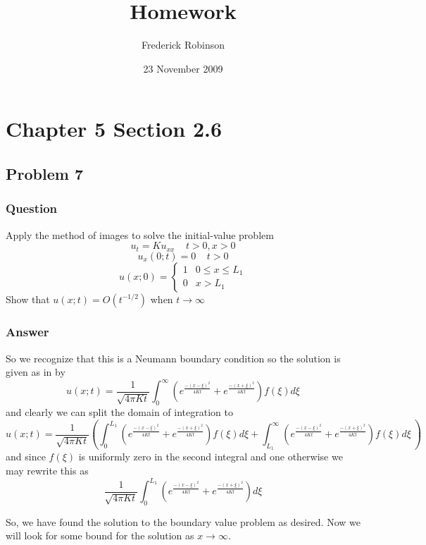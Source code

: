 \documentclass[12pt]{article}
\title{Homework}
\author{Frederick Robinson}
\date{23 November 2009}
\begin{document}

   \maketitle

\setcounter{tocdepth}{2} 

\tableofcontents

\section{Chapter 5 Section 2.6}

\subsection{Problem 7}
\subsubsection{Question}
Apply the method of images to solve the initial-value problem 
\[u_t=K u_{xx}\ \ \ \ \ t>0,x>0\]
\[u_x(0;t)=0\ \ \ \ \ t>0\] 
\[u(x;0)=\left\{ \begin{array}{ll}1 & 0\leq x \leq L_1\\ 0 & x>L_1\end{array} \right. \]
Show that $u(x;t)=O(t^{-1/2})$ when $t\to\infty$
\subsubsection{Answer}

So we recognize that this is a Neumann boundary condition so the solution is given as in \cite[Page 305]{pinsky} by
\[u(x;t)=\frac{1}{\sqrt{4\pi K t}}\int_0^\infty \left( e^{\frac{-(x-\xi)^2}{4 K t}}+e^{\frac{-(x+\xi)^2}{4 K t}} \right) f(\xi) d\xi\]
and clearly we can split the domain of integration to
\[u(x;t)=\frac{1}{\sqrt{4\pi K t}} \left( \int_0^{L_1} \left( e^{\frac{-(x-\xi)^2}{4 K t}}+e^{\frac{-(x+\xi)^2}{4 K t}} \right) f(\xi) d\xi +\int_{L_1}^\infty \left( e^{\frac{-(x-\xi)^2}{4 K t}}+e^{\frac{-(x+\xi)^2}{4 K t}} \right) f(\xi) d\xi\ \right) \]
and since $f(\xi)$ is uniformly zero in the second integral and one otherwise we may rewrite this as
\[\frac{1}{\sqrt{4\pi K t}}  \int_0^{L_1} \left( e^{\frac{-(x-\xi)^2}{4 K t}}+e^{\frac{-(x+\xi)^2}{4 K t}} \right)  d\xi   \]

So, we have found the solution to the boundary value problem as desired. Now we will look for some bound for the solution as $x \to \infty$.
\end{document}
